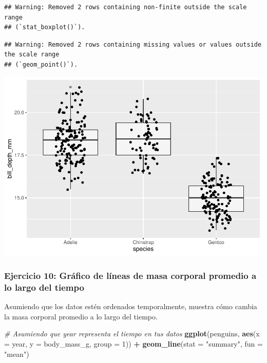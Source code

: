 \documentclass[
]{book}
\newenvironment{Shaded}{\begin{snugshade}}{\end{snugshade}}
\newcommand{\AttributeTok}[1]{\textcolor[rgb]{0.13,0.29,0.53}{#1}}
\newcommand{\CommentTok}[1]{\textcolor[rgb]{0.56,0.35,0.01}{\textit{#1}}}
\newcommand{\DecValTok}[1]{\textcolor[rgb]{0.00,0.00,0.81}{#1}}
\newcommand{\FunctionTok}[1]{\textcolor[rgb]{0.13,0.29,0.53}{\textbf{#1}}}
\newcommand{\NormalTok}[1]{#1}
\newcommand{\SpecialCharTok}[1]{\textcolor[rgb]{0.81,0.36,0.00}{\textbf{#1}}}
\newcommand{\StringTok}[1]{\textcolor[rgb]{0.31,0.60,0.02}{#1}}
\begin{document}
\begin{verbatim}
## Warning: Removed 2 rows containing non-finite outside the scale range
## (`stat_boxplot()`).
\end{verbatim}

\begin{verbatim}
## Warning: Removed 2 rows containing missing values or values outside the scale range
## (`geom_point()`).
\end{verbatim}

\includegraphics{bookdown-demo_files/figure-latex/unnamed-chunk-191-1.pdf}

\subsubsection{Ejercicio 10: Gráfico de líneas de masa corporal promedio a lo largo del tiempo}\label{ejercicio-10-gruxe1fico-de-luxedneas-de-masa-corporal-promedio-a-lo-largo-del-tiempo}

Asumiendo que los datos estén ordenados temporalmente, muestra cómo cambia la masa corporal promedio a lo largo del tiempo.

\begin{Shaded}
\begin{Highlighting}[]
\CommentTok{\# Asumiendo que \textquotesingle{}year\textquotesingle{} representa el tiempo en tus datos}
\FunctionTok{ggplot}\NormalTok{(penguins, }\FunctionTok{aes}\NormalTok{(}\AttributeTok{x =}\NormalTok{ year, }\AttributeTok{y =}\NormalTok{ body\_mass\_g, }\AttributeTok{group =} \DecValTok{1}\NormalTok{)) }\SpecialCharTok{+}
  \FunctionTok{geom\_line}\NormalTok{(}\AttributeTok{stat =} \StringTok{"summary"}\NormalTok{, }\AttributeTok{fun =} \StringTok{"mean"}\NormalTok{)}
\end{Highlighting}
\end{Shaded}
\end{document}
